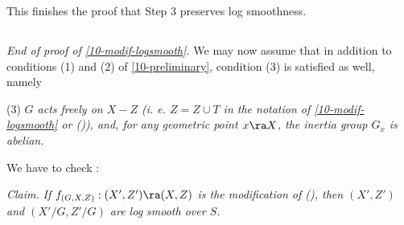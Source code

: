 \documentclass[10pt]{../fichiers-configuration-latex/smfart}
\begin{document}
This finishes the proof that Step 3 preserves log smoothness.

\subsection{}\label{10-end of proof} \textit{End of proof of
\ref{10-modif-logsmooth}.} We may now assume that in addition to conditions
(1) and (2) of \ref{10-preliminary}, condition (3) is satisfied as well, namely

(3) \textit{$G$ acts freely on $X - Z$ (i. e. $Z = Z \cup T$ in the notation
of \ref{10-modif-logsmooth} or ()),  and,
for any geometric point $x \ra X$, the inertia group $G_x$ is abelian.}

We have to check :

\medskip \textit{Claim.} \textit{If $f_{(G,X,Z)} : (X',Z') \ra (X,Z)$ is the
modification of (),
then $(X',Z')$ and $(X'/G,Z'/G)$ are log smooth over $S$.}
\end{document}
